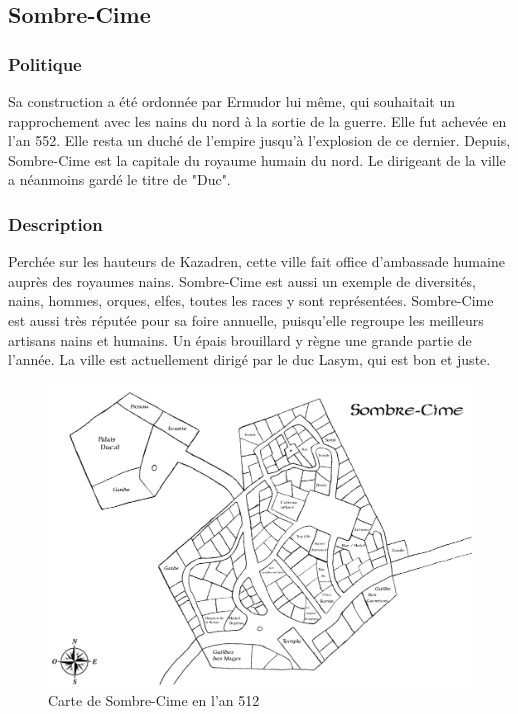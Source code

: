 \subsection{Sombre-Cime}
\subsubsection{Politique}
Sa construction a été ordonnée par Ermudor lui même, qui souhaitait un rapprochement avec les nains du nord à la sortie de la guerre. Elle fut achevée en l'an 552. Elle resta un duché de l'empire jusqu'à l'explosion de ce dernier.
\newline
Depuis, Sombre-Cime est la capitale du royaume humain du nord. Le dirigeant de la ville a néanmoins gardé le titre de "Duc".
\subsubsection{Description}
\hypertarget{sombrecime}{}Perchée sur les hauteurs de Kazadren, cette ville fait office d’ambassade humaine auprès des royaumes nains. Sombre-Cime est aussi un exemple de diversités, nains, hommes, orques, elfes, toutes les races y sont représentées. Sombre-Cime est aussi très réputée pour sa foire annuelle, puisqu’elle regroupe les meilleurs artisans nains et humains. Un épais brouillard y règne une grande partie de l’année. La ville est actuellement dirigé par le duc Lasym, qui est bon et juste.
\begin{figure}
 \begin{center}
   \includegraphics[scale=1.14, angle=90]{./Ressources/medieval/Carte_sombre_cime.jpg}
   \caption{Carte de Sombre-Cime en l'an 512}
 \end{center}
\end{figure}
